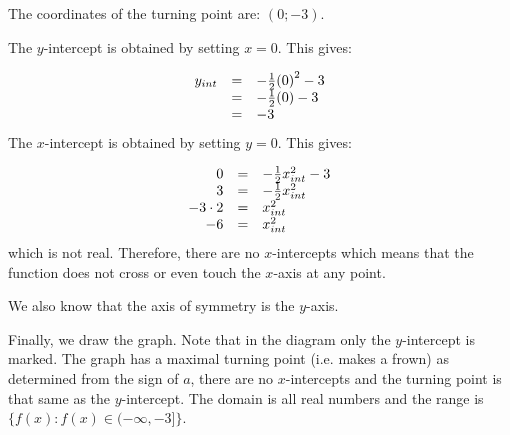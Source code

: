 The coordinates of the turning point are: $(0;-3)$.\par 
The $y$-intercept is obtained by setting $x=0$. This gives:\par 
\nopagebreak\noindent{}
\begin{equation*}
\begin{array}{ccc}\hfill {y}_{int}& =& -\frac{1}{2}{(0)}^{2}-3\hfill \\
 & =& -\frac{1}{2}(0)-3\hfill \\ & =& -3\hfill \end{array}
\end{equation*}
The $x$-intercept is obtained by setting $y=0$. This gives:\par 
\nopagebreak\noindent{}
\begin{equation*}
\begin{array}{ccc}\hfill 0& =& -\frac{1}{2}x_{int}^{2}-3\hfill \\ 
\hfill 3& =& -\frac{1}{2}x_{int}^{2}\hfill \\ \hfill -3\ensuremath{\cdot}2& =& x_{int}^{2}\hfill \\
\hfill -6& =& x_{int}^{2}\hfill \end{array}
\end{equation*}
which is not real. Therefore, there are no $x$-intercepts which means that the function does not cross or even touch the $x$-axis at any point.\par 
We also know that the axis of symmetry is the $y$-axis.\par 
Finally, we draw the graph. Note that in the diagram only the $y$-intercept is marked. The graph has a maximal turning point (i.e. makes a frown) as determined from the sign of $a$, there are no $x$-intercepts and the turning point is that same as the $y$-intercept. The domain is all real numbers and the range is $\{f(x):f(x)\in (-\infty ,-3]\}$.\par 

